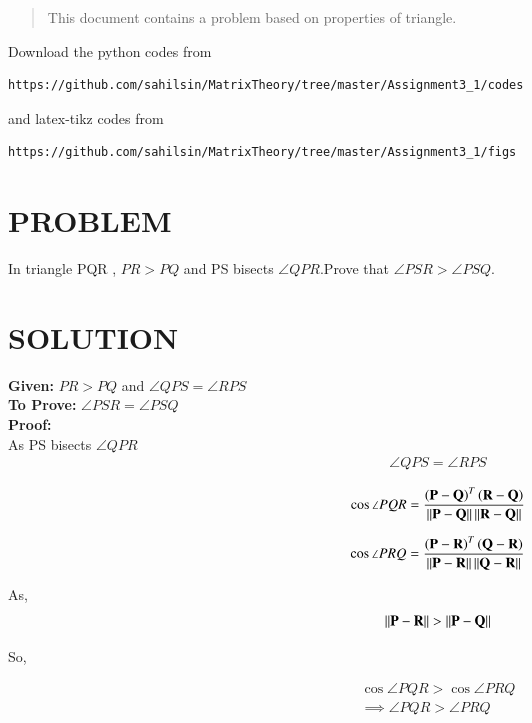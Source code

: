 \begin{abstract}
This document contains a problem based on properties of triangle.
\end{abstract}

Download the python codes from 
%
\begin{lstlisting}
https://github.com/sahilsin/MatrixTheory/tree/master/Assignment3_1/codes
\end{lstlisting}
%
and latex-tikz codes from 
%
\begin{lstlisting}
https://github.com/sahilsin/MatrixTheory/tree/master/Assignment3_1/figs
\end{lstlisting}
%
\section{PROBLEM}
In triangle PQR , $PR>PQ$ and PS bisects $\angle QPR$.Prove that $\angle PSR > \angle PSQ$. 

\section{SOLUTION}

\textbf{Given:} $PR>PQ$ and $\angle QPS = \angle RPS $\\
\textbf{To Prove:} $\angle PSR = \angle PSQ $\\
\textbf{Proof:}\\

As PS bisects $\angle QPR$
\begin{align}
    \angle QPS = \angle RPS \label{eq:1}
\end{align}

\begin{align}
\cos\angle PQR= \frac{\left( \mathbf{P - Q } \right)^T \left( \mathbf{R - Q } \right)}{\left\lVert\mathbf{ P - Q}\right\rVert\left\lVert\mathbf{ R - Q}\right\rVert}
\end{align}

\begin{align}
\cos\angle PRQ= \frac{\left( \mathbf{P - R } \right)^T \left( \mathbf{Q - R } \right)}{\left\lVert\mathbf{ P - R}\right\rVert\left\lVert\mathbf{ Q - R}\right\rVert}
\end{align}

As,
\begin{align}
    \left\lVert\mathbf{ P - R}\right\rVert>\left\lVert\mathbf{ P - Q}\right\rVert
\end{align}

So,



\begin{align}
    \cos\angle PQR > \cos \angle PRQ
\\
    \implies \angle PQR > \angle PRQ \label{eq:2}
\end{align}

